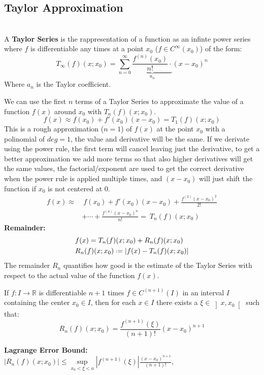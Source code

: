 \documentclass[8pt,a4paper]{extarticle}     %
\theoremstyle{definition}
\theoremstyle{definition}
\theoremstyle{definition}
\newcommand{\R}{\mathbb{R}}
\newcommand*{\defeq}{\mathrel{\vcenter{\baselineskip0.5ex \lineskiplimit0pt
            \hbox{\scriptsize.}\hbox{\scriptsize.}}}%
            =}
\begin{document}
\begin{multicols}{4}
\subsection{Taylor Approximation}
\begin{boxdefinition}\ \\
	A \textbf{Taylor Series} is the rappresentation of a function as an infinte power series where $f$ is differentiable any times at a point $x_0$ ($f\in C^\infty(x_0)$) of the form:
	$$T_{\infty}(f)(x;x_0) = \sum_{n=0}^\infty \underbrace{\frac{f^{(n)}(x_0)}{n!}\cdot}_{a_n}(x-x_0)^n$$
	Where $a_n$ is the Taylor coefficient.
\end{boxdefinition}
We can use the first $n$ terms of a Taylor Series to approximate the value of a function $f(x)$ around $x_0$ with $T_{n}(f)(x;x_0)$.
$$f(x) \approx f(x_0) + f'(x_0)(x-x_0) = T_{1}(f)(x;x_0)$$
This is a rough approximation ($n=1$) of $f(x)$ at the point $x_0$ with a polinomial of $deg=1$, the value and derivative will be the same. If we derivate using the power rule, the first term will cancel leaving just the derivative, to get a better approximation we add more terms so that also higher derivatives will get the same values, the factorial/exponent are used to get the correct derivative when the power rule is applied multiple times, and $(x-x_0)$ will just shift the function if $x_0$ is not centered at 0.
\[
\begin{split}
	f(x) \approx& \ f(x_0) + f'(x_0)(x-x_0) +\frac{f^{(2)}(x-x_0)^2}{2!} \\
	 &+ \cdots +\frac{f^{(n)}(x-x_0)^n}{n!} = \ T_{n}(f)(x;x_0)
\end{split}
\]
\textbf{Remainder:}
\[
\begin{split}
	&f(x) = T_{n}(f)(x;x_0) + R_{n}(f)(x;x_0)  \\
	&R_{n}(f)(x;x_0) \defeq |f(x)-T_{n}(f)(x;x_0)|
\end{split}
\]
The remainder $R_n$ quantifies how good is the estimate of the Taylor Series with respect to the actual value of the function $f(x)$.

\begin{boxtheorem}
	If $f:I\rightarrow\R$ is differentiable $n+1$ times $f \in C^{(n+1)}(I)$ in an interval $I$ containing the center $x_0\in I$, then for each $x\in I$ there exists a $\xi \in \left]x,x_0\right[$ such that:
	$$ R_{n}(f)(x;x_0) = \frac{f^{(n+1)}(\xi)}{(n+1)!}(x-x_0)^{n+1}$$
\end{boxtheorem}
\textbf{Lagrange Error Bound:} \\
$|R_{n}(f)(x;x_0)| \leq \underset{x_0<\xi<a}{\sup}\left|f^{(n+1)}(\xi)\right|\frac{(x-x_0)^{n+1}}{(n+1)!}$,



\end{multicols}
\end{document}
